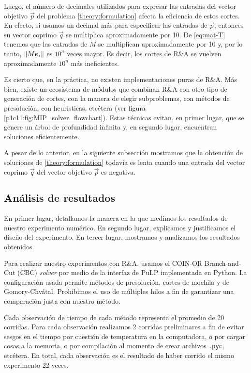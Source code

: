 Luego, el número de decimales utilizados para expresar las entradas del vector objetivo $\vec{p}$ del problema
\eqref{theory:formulation} afecta la eficiencia de estos cortes. En efecto, si usamos
un decimal más para especificar las entradas de $\vec{p}$, entonces su vector coprimo $\vec{q}$ se
multiplica aproximadamente por 10. De \eqref{eq:mat-T} tenemos que las entradas de $M$ se
multiplican aproximadamente por 10 y, por lo tanto, $\left\lVert M\boldsymbol{e}_i \right\rVert$ es $10^{n}$ veces mayor.
Es decir, los cortes de R\&A se vuelven aproximadamente $10^{n}$ más ineficientes.

Es cierto que, en la práctica, no existen implementaciones puras de R\&A. Más bien, existe un
ecosistema de módulos que combinan R\&A con otro tipo de generación de cortes, con la manera de
elegir subproblemas, con métodos de presolución, con heurísticas, etcétera (ver figura
\ref{p1c11:fig:MIP_solver_flowchart}). Estas técnicas evitan, en primer lugar, que se genere un
árbol de profundidad infinita y, en segundo lugar, encuentran soluciones eficientemente.

A pesar de lo anterior, en la siguiente subsección mostramos que la obtención de soluciones de
\eqref{theory:formulation} todavía es lenta cuando una entrada del vector coprimo $\vec{q}$ del
vector objetivo $\vec{p}$ es negativa.

\subsection{Análisis de resultados}
\label{subsec:inf:res}
\noindent
En primer lugar, detallamos la manera en la que medimos los resultados de nuestro experimento
numérico. En segundo lugar, explicamos y justificamos el diseño del experimento. En tercer lugar,
mostramos y analizamos los resultados obtenidos.

Para realizar nuestro experimentos con R\&A, usamos el COIN-OR Branch-and-Cut (CBC) \textit{solver}
por medio de la interfaz de PuLP implementada en Python. La configuración usada permite métodos de
presolución, cortes de mochila y de Gomory-Chvátal. Prohibimos el uso de múltiples hilos a fin de
garantizar una comparación justa con nuestro método.

Cada observación de tiempo de cada método representa el promedio de 20 corridas. Para cada
observación realizamos 2 corridas preliminares a fin de evitar sesgos en el tiempo por cuestión de
temperatura en la computadora, o por cargar cosas a la memoria, o por compilación al momento de
crear archivos \texttt{.pyc}, etcétera. En total, cada observación es el resultado de haber corrido
el mismo experimento 22 veces.

